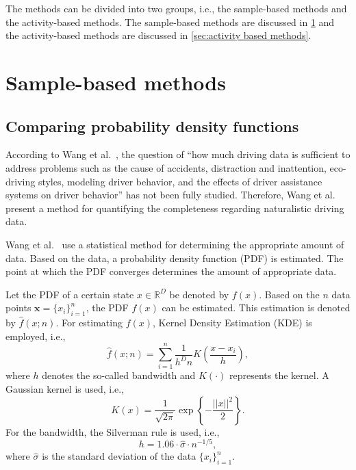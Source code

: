 \documentclass[10pt,final,a4paper,oneside,onecolumn]{article}
\newcommand*{\etal}{et al.}                                     %
\theoremstyle{plain}\newtheorem{definition}{Definition}[section]    %
\theoremstyle{definition}\newtheorem{example}{Example}[section]     %
\theoremstyle{remark}\newtheorem{remarkenv}{Remark}[section]        %
\begin{document}
The methods can be divided into two groups, i.e., the sample-based methods and the activity-based methods. The sample-based methods are discussed in \cref{sec:sample based} and the activity-based methods are discussed in \cref{sec:activity based methods}.


\section{Sample-based methods}
\label{sec:sample based}


\subsection{Comparing probability density functions}
\label{sec:sample based pdf}

According to Wang \etal\ \cite{wang2017much}, the question of ``how much driving data is sufficient to address problems such as the cause of accidents, distraction and inattention, eco-driving styles, modeling driver behavior, and the effects of driver assistance systems on driver behavior'' has not been fully studied. Therefore, Wang \etal\ \cite{wang2017much} present a method for quantifying the completeness regarding naturalistic driving data. 

Wang \etal\ \cite{wang2017much} use a statistical method for determining the appropriate amount of data. Based on the data, a probability density function (PDF) is estimated. The point at which the PDF converges determines the amount of appropriate data. 

Let the PDF of a certain state $x \in \mathds{R}^D$ be denoted by $f(x)$. Based on the $n$ data points $\textbf{x}=\{x_i\}_{i=1}^n$, the PDF $f(x)$ can be estimated. This estimation is denoted by $\hat{f}(x;n)$. For estimating $f(x)$, Kernel Density Estimation (KDE) \cite{rosenblatt1956remarks, parzen1962estimation} is employed, i.e.,
\begin{equation} \label{eq:kde}
	\hat{f}(x;n) = \sum_{i=1}^n \frac{1}{h^D n} K \left( \frac{x - x_i}{h} \right),
\end{equation}
where $h$ denotes the so-called bandwidth and $K(\cdot)$ represents the kernel. A Gaussian kernel is used, i.e.,
\begin{equation}
	K(x) = \frac{1}{\sqrt{2\pi}} \exp \left\{ -\frac{||x||^2}{2}\right\}.
\end{equation}
For the bandwidth, the Silverman rule \cite{silverman1986density} is used, i.e., 
\begin{equation}
	h=1.06\cdot\hat{\sigma}\cdot n^{-1/5},
\end{equation}
where $\hat{\sigma}$ is the standard deviation of the data $\{x_i\}_{i=1}^n$.
\end{document}
